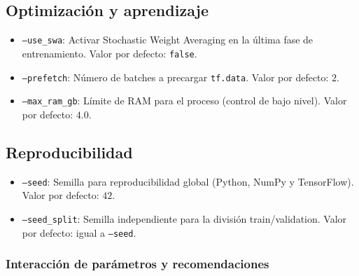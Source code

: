 \subsection*{Optimización y aprendizaje}

\begin{itemize}
    \item \texttt{--use\_swa}: Activar Stochastic Weight Averaging en la última fase de entrenamiento. Valor por defecto: \texttt{false}.
    
    \item \texttt{--prefetch}: Número de batches a precargar \texttt{tf.data}. Valor por defecto: $2$.
    
    \item \texttt{--max\_ram\_gb}: Límite de RAM para el proceso (control de bajo nivel). Valor por defecto: $4.0$.
\end{itemize}

\subsection*{Reproducibilidad}

\begin{itemize}
    \item \texttt{--seed}: Semilla para reproducibilidad global (Python, NumPy y TensorFlow). Valor por defecto: $42$.
    
    \item \texttt{--seed\_split}: Semilla independiente para la división train/validation. Valor por defecto: igual a \texttt{--seed}.
\end{itemize}
\subsubsection{Interacción de parámetros y recomendaciones}

